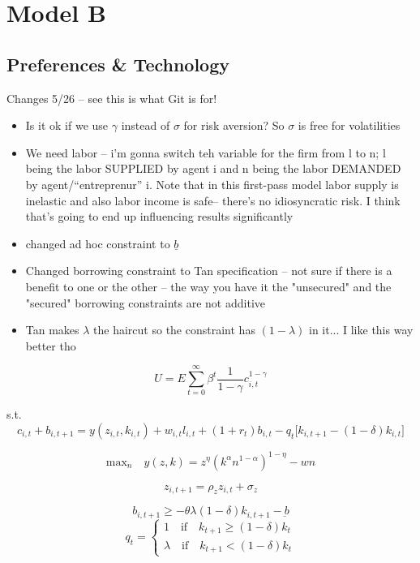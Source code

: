 \documentclass{article}
\begin{document}
\section{Model B}

\subsection{Preferences \& Technology}

Changes 5/26 -- see this is what Git is for! 
\begin{itemize}
    \item Is it ok if we use $\gamma$ instead of $\sigma$ for risk aversion? So $\sigma$ is free for volatilities 
    \item We need labor -- i'm gonna switch teh variable for the firm from l to n; l being the labor SUPPLIED by agent i and n being the labor DEMANDED by agent/``entreprenur'' i. Note that in this first-pass model labor supply is inelastic and also labor income is safe-- there's no idiosyncratic risk. I think that's going to end up influencing results significantly  
    \item changed ad hoc constraint to $\underline{b}$
    \item Changed borrowing constraint to Tan specification -- not sure if there is a benefit to one or the other -- the way you have it the "unsecured" and the "secured" borrowing constraints are not additive 
    \item  Tan makes  $\lambda$ the haircut so the constraint has $(1-\lambda)$ in it... I like this way better tho 
\end{itemize}

\[U= E\sum_{t=0}^{\infty}\beta^t \frac{1}{1-\gamma}c_{i,t}^{1-\gamma} \]


s.t. 
\[c_{i,t} + b_{i,t+1} = y(z_{i,t},k_{i,t}) + w_{i,t} l_{i,t} + (1+r_{t})b_{i,t} - q_{t} \big[k_{i,t+1} - (1-\delta)k_{i,t} \big]\]

\[ \text{max}_{n} \quad y(z,k) = z^{\eta}\left(k^{\alpha}n^{1-\alpha}\right)^{1-\eta} - wn\]

\[z_{i,t+1}= \rho_z z_{i,t} + \sigma_z\]

\[b_{i,t+1}\geq -\theta\lambda(1-\delta)k_{i,t+1} - \underbar{b}  \]
\[q_t =
\begin{cases}
1 \quad \text{if} \quad k_{t+1} \geq (1-\delta)k_t\\
\lambda \quad \text{if}\quad  k_{t+1} < (1-\delta)k_t  
\end{cases}\]
\end{document}
